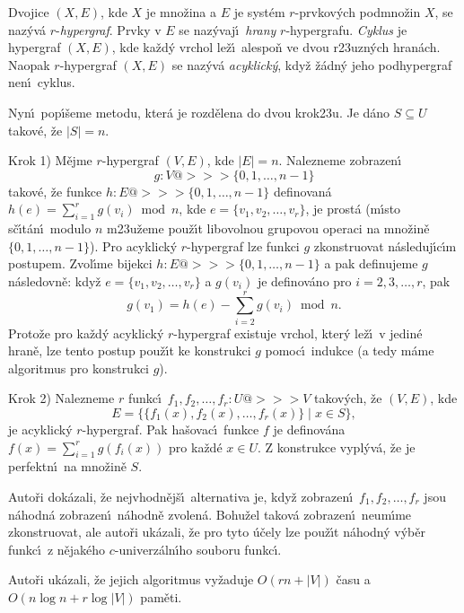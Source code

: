 \flushpar Dvojice $(X,E)$, kde $X$ je mno\v zina a $E$ je syst\'em 
$r$-prvkov\'ych podmno\v zin $X$, se naz\'yv\'a $r$-\emph{hypergraf}.  
Prvky v $E$ se naz\'yvaj\'\i\ \emph{hrany} $r$-hypergrafu.  
\emph{Cyklus} je hypergraf $(X,E)$, kde ka\v zd\'y vrchol le\v z\'\i\ 
alespo\v n ve dvou r\accent23uzn\'ych hran\'ach.  Naopak 
$r$-hypergraf $(X,E)$ se naz\'yv\'a \emph{acyklick\'y}, kdy\v z 
\v z\'adn\'y jeho podhypergraf nen\'\i\ cyklus.  
\medskip

\flushpar Nyn\'\i\ pop\'\i\v seme metodu, kter\'a je rozd\v elena do 
dvou krok\accent23u. Je d\'ano $S\subseteq U$ takov\'e, \v ze 
$|S|=n$.
\medskip

\flushpar Krok 1) M\v ejme $r$-hypergraf $(V,E)$, kde $|E|=n$.  Nalezneme 
zobrazen\'\i\ $$g:V@>>>\{0,1,\dots,n-1\}$$ 
takov\'e, \v ze funkce 
$h:E@>>>\{0,1,\dots,n-1\}$ definovan\'a $h(e)=\sum_{i=1}^rg(v_i)\bmod n$, 
kde $e=\{v_1,v_2,\dots,v_r\}$, je prost\'a (m\'\i sto s\v c\'\i t\'an\'\i\ modulo $n$ 
m\accent23u\v zeme pou\v z\'\i t libovolnou grupovou operaci na 
mno\v zin\v e $\{0,1,\dots,n-1\}$).  Pro acyklick\'y $r$-hypergraf lze 
funkci $g$ zkonstruovat n\'asle\-duj\'\i c\'\i m postupem.  Zvol\'\i me 
bijekci $h:E@>>>\{0,1,\dots,n-1\}$ a pak definujeme $g$ 
n\'asledovn\v e:  kdy\v z $e=\{v_1,v_2,\dots,v_r\}$ a $g(v_i)$ je 
definov\'ano pro $i=2,3,\dots,r$, pak 
$$g(v_1)=h(e)-\sum_{i=2}^rg(v_i)\bmod n.$$
Proto\v ze pro ka\v zd\'y acyklick\'y $r$-hypergraf existuje vrchol, kter\'y 
le\v z\'\i\ v jedin\'e hran\v e, lze tento postup pou\v z\'\i t ke konstrukci $
g$ 
pomoc\'\i\ indukce (a tedy m\'ame algoritmus pro konstrukci $g$).  
\smallskip

\flushpar Krok 2) Nalezneme $r$ funkc\'\i\ $f_1,f_2,\dots,f_r:U@>>>
V$ takov\'ych, \v ze 
$(V,E)$, kde $$E=\{\{f_1(x),f_2(x),\dots,f_r(x)\}\mid x\in S\},$$ je acyklick\'y 
$r$-hypergraf.  Pak ha\v sovac\'\i\ funkce $f$ je definov\'ana 
$f(x)=\sum_{i=1}^rg(f_i(x))$ pro ka\v zd\'e $x\in U$.  Z konstrukce 
vypl\'yv\'a, \v ze je perfektn\'\i\ na mno\v zin\v e $S$.  
\medskip

\flushpar Auto\v ri dok\'azali, \v ze 
nejvhodn\v ej\v s\'\i\ alternativa je, kdy\v z zobrazen\'\i\ $f_1
,f_2,\dots,f_r$ 
jsou n\'ahodn\'a zob\-razen\'\i\ n\'ahodn\v e zvolen\'a. Bohu\-\v zel takov\'a 
zobrazen\'\i\ neum\'\i me zkonstruovat, ale auto\v ri uk\'azali, \v ze 
pro tyto \'u\v cely lze pou\v z\'\i t n\'ahodn\'y v\'yb\v er funkc\'\i\ z 
n\v ejak\'eho $c$-univerz\'aln\'\i ho souboru funk\-c\'\i . 
\medskip

\flushpar Auto\v ri uk\'azali, \v ze jejich algoritmus vy\v zaduje $
O(rn+|V|)$ 
\v casu a $O(n\log n+r\log|V|)$ pam\v eti. 
\medskip

